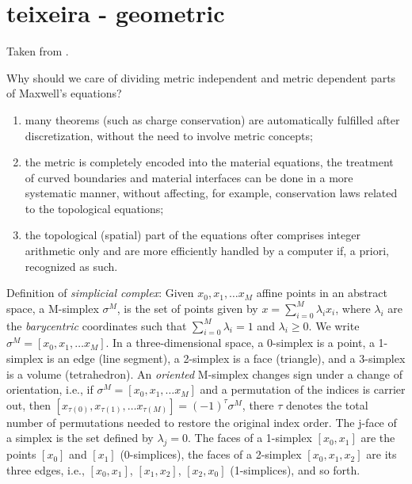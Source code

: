 






\section{teixeira - geometric}
Taken from \cite{teixeira_geometric}.

Why should we care of dividing metric independent and metric dependent
parts of Maxwell's equations?
\begin{enumerate}
\item
  many theorems (such as charge conservation) are automatically
  fulfilled after discretization, without the need to involve metric
  concepts;
\item
  the metric is completely encoded into the material equations, the
  treatment of curved boundaries and material interfaces can be done
  in a more systematic manner, without affecting, for example,
  conservation laws related to the topological equations;
\item
  the topological (spatial) part of the equations ofter comprises
  integer arithmetic only and are more efficiently handled by a
  computer if, a priori, recognized as such.
\end{enumerate}

Definition of \emph{simplicial complex}: Given $x_0,x_1,\ldots x_M$
affine points in an abstract space, a M-simplex $\sigma^M$, is the set
of points given by $x = \sum_{i=0}^M \lambda_i x_i$, where $\lambda_i$
are the \emph{barycentric} coordinates such that $\sum_{i=0}^M
\lambda_i = 1$ and $\lambda_i \ge 0$. We write $\sigma^M =
[x_0,x_1,\ldots x_M]$. In a three-dimensional space, a 0-simplex is a
point, a 1-simplex is an edge (line segment), a 2-simplex is a face
(triangle), and a 3-simplex is a volume (tetrahedron). An
\emph{oriented} M-simplex changes sign under a change of orientation,
i.e., if $\sigma^M = [x_0,x_1,\ldots x_M]$ and a permutation of the
indices is carrier out, then $[x_{\tau(0)},x_{\tau(1)},\ldots
  x_{\tau(M)}] = (-1)^\tau \sigma^M$, there $\tau$ denotes the total
number of permutations needed to restore the original index order. The
j-face of a simplex is the set defined by $\lambda_j = 0$. The faces
of a 1-simplex $[x_0,x_1]$ are the points $[x_0]$ and $[x_1]$
(0-simplices), the faces of a 2-simplex $[x_0,x_1,x_2]$ are its three
edges, i.e., $[x_0,x_1]$, $[x_1,x_2]$, $[x_2,x_0]$ (1-simplices), and
so forth.

